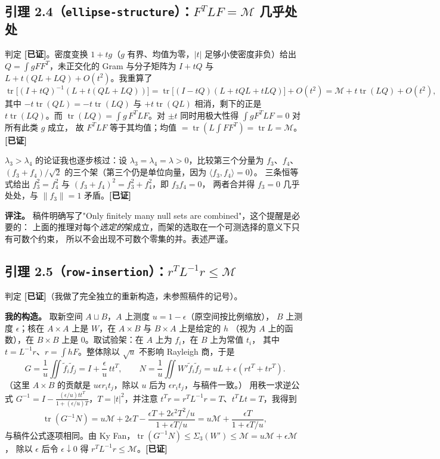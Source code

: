 \documentclass[UTF8,11pt]{ctexart}
\theoremstyle{definition}
\newcommand{\tr}{\operatorname{tr}}
\newcommand{\ok}{\textcolor[rgb]{0.05,0.45,0.15}{\bfseries [已证]}}
\begin{document}
\subsection{引理 2.4（\texttt{ellipse-structure}）：$F^TLF=\mathcal M$ 几乎处处}

判定 \ok。密度变换 $1+tg$（$g$ 有界、均值为零，$|t|$ 足够小使密度非负）给出
$Q=\int gFF^T$，未正交化的 Gram 与分子矩阵为 $I+tQ$ 与 $L+t(QL+LQ)+O(t^2)$。我重算了
\[
 \tr\bigl[(I+tQ)^{-1}(L+t(QL+LQ))\bigr]
 =\tr\bigl[(I-tQ)(L+tQL+tLQ)\bigr]+O(t^2)
 =\mathcal M+t\tr(LQ)+O(t^2),
\]
其中 $-t\tr(QL)=-t\tr(LQ)$ 与 $+t\tr(QL)$ 相消，剩下的正是 $t\tr(LQ)$。而
$\tr(LQ)=\int g\,F^TLF$。对 $\pm t$ 同时用极大性得 $\int gF^TLF=0$ 对所有此类 $g$ 成立，
故 $F^TLF$ 等于其均值；均值 $=\tr(L\int FF^T)=\tr L=\mathcal M$。\hfill\ok

$\lambda_3>\lambda_4$ 的论证我也逐步核过：设 $\lambda_3=\lambda_4=\lambda>0$，比较第三个分量为
$f_3$、$f_4$、$(f_3+f_4)/\sqrt2$ 的三个架（第三个仍是单位向量，因为 $\langle f_3,f_4\rangle=0$）。
三条恒等式给出 $f_3^2=f_4^2$ 与 $(f_3+f_4)^2=f_3^2+f_4^2$，即 $f_3f_4=0$，
两者合并得 $f_3=0$ 几乎处处，与 $\|f_3\|=1$ 矛盾。\hfill\ok

\textbf{评注。} 稿件明确写了"Only finitely many null sets are combined"，这个提醒是必要的：
上面的推理对每个\emph{选定的}架成立，而架的选取在一个可测选择的意义下只有可数个约束，
所以不会出现不可数个零集的并。表述严谨。

\subsection{引理 2.5（\texttt{row-insertion}）：$r^TL^{-1}r\le\mathcal M$}

判定 \ok（我做了完全独立的重新构造，未参照稿件的记号）。

\textbf{我的构造。} 取新空间 $A\sqcup B$，$A$ 上测度 $u=1-\epsilon$（原空间按比例缩放），
$B$ 上测度 $\epsilon$；核在 $A\times A$ 上是 $W$，在 $A\times B$ 与 $B\times A$ 上是给定的 $h$
（视为 $A$ 上的函数），在 $B\times B$ 上是 $0$。取试验架：在 $A$ 上为 $f_i$，在 $B$ 上为常值 $t_i$，
其中 $t=L^{-1}r$、$r=\int hF$。整体除以 $\sqrt u$ 不影响 Rayleigh 商，于是
\[
 G=\frac1u\iint\tilde f_i\tilde f_j=I+\frac\epsilon u\,tt^T,\qquad
 N=\frac1u\iint W'\tilde f_i\tilde f_j=uL+\epsilon(rt^T+tr^T).
\]
（这里 $A\times B$ 的贡献是 $u\epsilon r_it_j$，除以 $u$ 后为 $\epsilon r_it_j$，与稿件一致。）
用秩一求逆公式 $G^{-1}=I-\frac{(\epsilon/u)tt^T}{1+(\epsilon/u)T}$，$T=|t|^2$，并注意
$t^Tr=r^TL^{-1}r=T$、$t^TLt=T$，我得到
\[
 \tr(G^{-1}N)=u\mathcal M+2\epsilon T-\frac{\epsilon T+2\epsilon^2T^2/u}{1+\epsilon T/u}
            =u\mathcal M+\frac{\epsilon T}{1+\epsilon T/u},
\]
与稿件公式逐项相同。由 Ky Fan，$\tr(G^{-1}N)\le\Sigma_3(W')\le\mathcal M=u\mathcal M+\epsilon\mathcal M$，
除以 $\epsilon$ 后令 $\epsilon\downarrow0$ 得 $r^TL^{-1}r\le\mathcal M$。\hfill\ok
\end{document}
